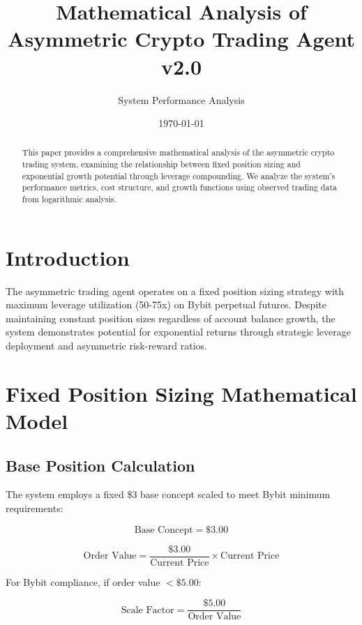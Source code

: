 \documentclass{article}
\title{Mathematical Analysis of Asymmetric Crypto Trading Agent v2.0}
\author{System Performance Analysis}
\date{\today}
\begin{document}
\maketitle

\begin{abstract}
This paper provides a comprehensive mathematical analysis of the asymmetric crypto trading system, examining the relationship between fixed position sizing and exponential growth potential through leverage compounding. We analyze the system's performance metrics, cost structure, and growth functions using observed trading data from logarithmic analysis.
\end{abstract}

\section{Introduction}

The asymmetric trading agent operates on a fixed position sizing strategy with maximum leverage utilization (50-75x) on Bybit perpetual futures. Despite maintaining constant position sizes regardless of account balance growth, the system demonstrates potential for exponential returns through strategic leverage deployment and asymmetric risk-reward ratios.

\section{Fixed Position Sizing Mathematical Model}

\subsection{Base Position Calculation}

The system employs a fixed \$3 base concept scaled to meet Bybit minimum requirements:

\begin{equation}
\text{Base Concept} = \$3.00
\end{equation}

\begin{equation}
\text{Order Value} = \frac{\$3.00}{\text{Current Price}} \times \text{Current Price}
\end{equation}

For Bybit compliance, if order value $< \$5.00$:

\begin{equation}
\text{Scale Factor} = \frac{\$5.00}{\text{Order Value}}
\end{equation}
\end{document}
